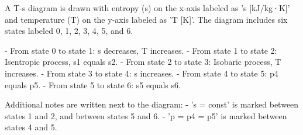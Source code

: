 A T-s diagram is drawn with entropy (s) on the x-axis labeled as 's [kJ/kg·K]' and temperature (T) on the y-axis labeled as 'T [K]'. The diagram includes six states labeled 0, 1, 2, 3, 4, 5, and 6.  

- From state 0 to state 1: s decreases, T increases.  
- From state 1 to state 2: Isentropic process, s1 equals s2.  
- From state 2 to state 3: Isobaric process, T increases.  
- From state 3 to state 4: s increases.  
- From state 4 to state 5: p4 equals p5.  
- From state 5 to state 6: s5 equals s6.  

Additional notes are written next to the diagram:  
- 's = const' is marked between states 1 and 2, and between states 5 and 6.  
- 'p = p4 = p5' is marked between states 4 and 5.